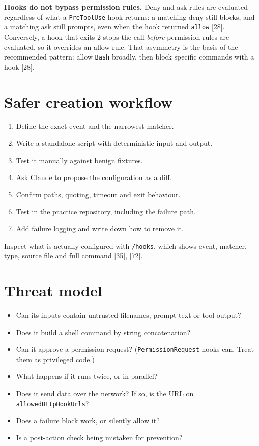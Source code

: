 \documentclass[11pt,a4paper,twoside,openany]{book}
\begin{document}
\textbf{Hooks do not bypass permission rules.} Deny and ask rules are evaluated regardless of what a \texttt{Pre\allowbreak{}Tool\allowbreak{}Use} hook returns: a matching deny still blocks, and a matching ask still prompts, even when the hook returned \texttt{allow} [28]. Conversely, a hook that exits 2 stops the call \emph{before} permission rules are evaluated, so it overrides an allow rule. That asymmetry is the basis of the recommended pattern: allow \texttt{Bash} broadly, then block specific commands with a hook [28].


\FloatBarrier
\setcounter{section}{3}
\section{Safer creation workflow}

\begin{enumerate}
\item Define the exact event and the narrowest matcher.
\item Write a standalone script with deterministic input and output.
\item Test it manually against benign fixtures.
\item Ask Claude to propose the configuration as a diff.
\item Confirm paths, quoting, timeout and exit behaviour.
\item Test in the practice repository, including the failure path.
\item Add failure logging and write down how to remove it.
\end{enumerate}

Inspect what is actually configured with \texttt{/\allowbreak{}hooks}, which shows event, matcher, type, source file and full command [35], [72].


\FloatBarrier
\setcounter{section}{4}
\section{Threat model}

\begin{itemize}
\item Can its inputs contain untrusted filenames, prompt text or tool output?
\item Does it build a shell command by string concatenation?
\item Can it approve a permission request? (\texttt{Permission\allowbreak{}Request} hooks can. Treat them as privileged code.)
\item What happens if it runs twice, or in parallel?
\item Does it send data over the network? If so, is the URL on \texttt{allowed\allowbreak{}Http\allowbreak{}Hook\allowbreak{}Urls}?
\item Does a failure block work, or silently allow it?
\item Is a post-action check being mistaken for prevention?
\end{itemize}
\end{document}
